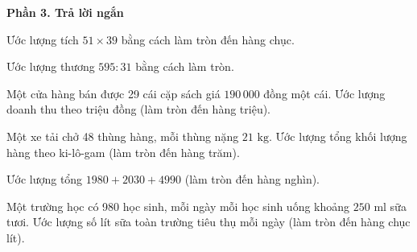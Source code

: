 \textbf{Phần 3. Trả lời ngắn}

\begin{ex} %
Ước lượng tích $51 \times 39$ bằng cách làm tròn đến hàng chục.
\end{ex}

\begin{ex} %
Ước lượng thương $595 : 31$ bằng cách làm tròn.
\end{ex}

\begin{ex} %
Một cửa hàng bán được 29 cái cặp sách giá $190\,000$ đồng một cái. Ước lượng doanh thu theo triệu đồng (làm tròn đến hàng triệu).
\end{ex}

\begin{ex} %
Một xe tải chở 48 thùng hàng, mỗi thùng nặng $21\text{ kg}$. Ước lượng tổng khối lượng hàng theo ki-lô-gam (làm tròn đến hàng trăm).
\end{ex}

\begin{ex} %
Ước lượng tổng $1980 + 2030 + 4990$ (làm tròn đến hàng nghìn).
\end{ex}

\begin{ex} %
Một trường học có 980 học sinh, mỗi ngày mỗi học sinh uống khoảng $250\text{ ml}$ sữa tươi. Ước lượng số lít sữa toàn trường tiêu thụ mỗi ngày (làm tròn đến hàng chục lít).
\end{ex}
